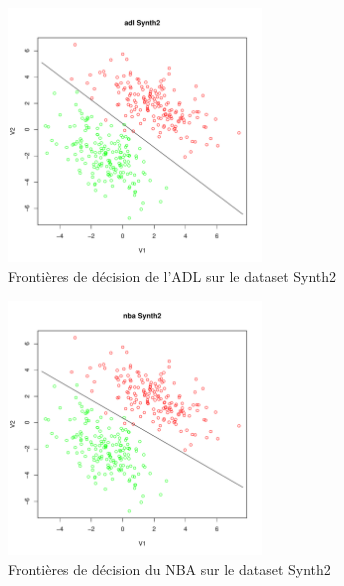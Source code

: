 \documentclass{report}
\begin{document}
\newpage
\begin{figure}[ht!]
\begin{center}
    \includegraphics[width=0.6\textwidth]{results/adl/adl-Synth2.pdf}
    \caption{Frontières de décision de l'ADL sur le dataset Synth2}
\end{center}
\end{figure}

\begin{figure}[ht!]
\begin{center}
    \includegraphics[width=0.6\textwidth]{results/nba/nba-Synth2.pdf}
    \caption{Frontières de décision du NBA sur le dataset Synth2}
\end{center}
\end{figure}
\end{document}
